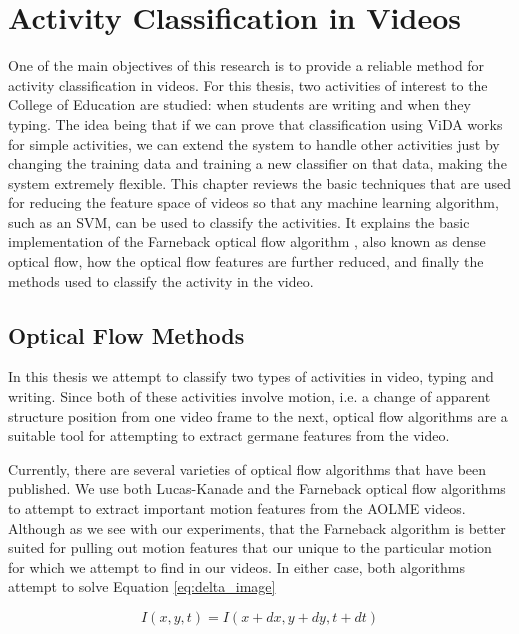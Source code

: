 \chapter{Activity Classification in Videos}
One of the main objectives of this research is to provide a reliable method
for activity classification in videos. For this thesis, two activities of
interest to the College of Education are studied: when students are writing and when they
typing. The idea being that if we can prove that classification using ViDA
works for simple activities, we can extend the system to handle
other activities just by changing the training data and training a new classifier
on that data, making the system extremely flexible. This chapter reviews the basic techniques that are used
for reducing the feature space of videos so that any machine learning algorithm,
such as an SVM, can be used to classify the activities. It explains the basic
implementation of the Farneback optical flow algorithm \cite{farneback2003two}, also known as dense
optical flow, how the optical flow features are further reduced, and finally the
methods used to classify the activity in the video.

\section{\label{section:optical_flow_methods}Optical Flow Methods}
In this thesis we attempt to classify two types of activities in video,  typing
and writing. Since both of these activities involve motion, i.e. a change of
apparent structure position from one video frame to the next, optical flow
algorithms  are a suitable tool for attempting to extract germane features from
the video.

Currently, there are several varieties of optical flow algorithms that have been
published. We use both Lucas-Kanade \cite{lucas1981iterative} and the Farneback
\cite{farneback2003two}  optical flow algorithms to attempt to extract
important motion features from the AOLME videos. Although as we see with our
experiments, that the Farneback algorithm is better suited for pulling out
motion features that our unique to the particular motion for which we attempt
to find in our videos. In either case, both algorithms attempt to solve
Equation \ref{eq:delta_image}

\begin{equation}
I(x,y,t) = I(x+dx, y+dy, t+dt)
\label{eq:delta_image}
\end{equation}

